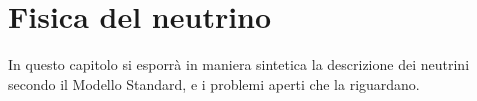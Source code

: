 \documentclass[../../main.tex]{subfiles}
\begin{document}
\section{Fisica del neutrino} \label{sec:fisica-del-neutrino}
  In questo capitolo si esporrà in maniera sintetica la descrizione dei
  neutrini secondo il Modello Standard, e i problemi aperti che la riguardano.

  

  
\end{document}
